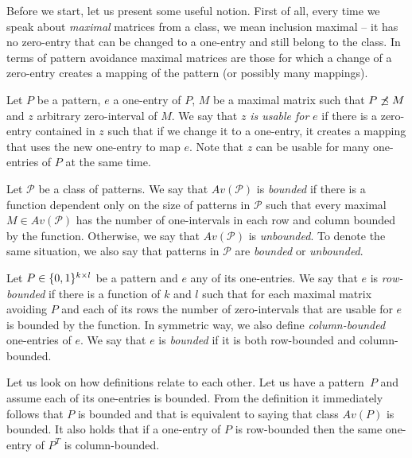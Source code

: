 Before we start, let us present some useful notion. First of all, every time we speak about \emph{maximal} matrices from a class, we mean inclusion maximal -- it has no zero-entry that can be changed to a one-entry and still belong to the class. In terms of pattern avoidance maximal matrices are those for which a change of a zero-entry creates a mapping of the pattern (or possibly many mappings).
\begin{defn}
Let $P$ be a pattern, $e$ a one-entry of $P$, $M$ be a maximal matrix such that $P\not\preceq M$ and $z$ arbitrary zero-interval of $M$. We say that $z$ \emph{is usable for} $e$ if there is a zero-entry contained in $z$ such that if we change it to a one-entry, it creates a mapping that uses the new one-entry to map $e$. Note that $z$ can be usable for many one-entries of $P$ at the same time. 
\end{defn}
\begin{defn}
Let $\mathcal{P}$ be a class of patterns. We say that $Av(\mathcal{P})$ is \emph{bounded} if there is a function dependent only on the size of patterns in $\mathcal{P}$ such that every maximal $M\in Av(\mathcal{P})$ has the number of one-intervals in each row and column bounded by the function. Otherwise, we say that $Av(\mathcal{P})$ is \emph{unbounded}. To denote the same situation, we also say that patterns in $\mathcal{P}$ are \emph{bounded} or \emph{unbounded}.
\end{defn}
\begin{defn}
Let $P\in\{0,1\}^{k\times l}$ be a pattern and $e$ any of its one-entries. We say that $e$ is \emph{row-bounded} if there is a function of $k$ and $l$ such that for each maximal matrix avoiding $P$ and each of its rows the number of zero-intervals that are usable for $e$ is bounded by the function. In symmetric way, we also define \emph{column-bounded} one-entries of $e$. We say that $e$ is \emph{bounded} if it is both row-bounded and column-bounded.
\end{defn}
Let us look on how definitions relate to each other. Let us have a pattern~$P$ and assume each of its one-entries is bounded. From the definition it immediately follows that $P$ is bounded and that is equivalent to saying that class $Av(P)$ is bounded. It also holds that if a one-entry of $P$ is row-bounded then the same one-entry of $P^T$ is column-bounded.

